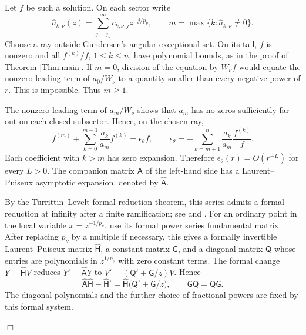 \documentclass[a4paper,12pt]{article}
\newenvironment{proof}
{\noindent{\it Proof.}}{\hfill $\Box$\par\vspace{2.5mm}}
\numberwithin{equation}{section}
\begin{document}
\begin{proof}
Let $f$ be such a solution. On each sector write
\[
 \widehat a_{k,\nu}(z)
 =\sum_{j=j_\nu}^{\infty}c_{k,\nu,j}z^{-j/p_\nu},
 \qquad
 m=\max\{k:\widehat a_{k,\nu}\ne0\}.
\]
Choose a ray outside Gundersen's angular exceptional set. On its tail,
$f$ is nonzero and all $f^{(k)}/f$, $1\le k\le n$, have polynomial bounds,
as in the proof of Theorem \ref{Thm.main}.
If $m=0$, division of the equation by $W_\nu f$ would equate the nonzero
leading term of $a_0/W_\nu$ to a quantity smaller than every negative
power of $r$. This is impossible. Thus $m\ge1$.

The nonzero leading term of $a_m/W_\nu$ shows that $a_m$ has no zeros
sufficiently far out on each closed subsector. Hence, on the chosen ray,
\begin{equation}\label{eq.puiseux.scalar}
 f^{(m)}+\sum_{k=0}^{m-1}\frac{a_k}{a_m}f^{(k)}
 =\epsilon_\theta f,
 \qquad
 \epsilon_\theta
 =-\sum_{k=m+1}^{n}\frac{a_k}{a_m}\frac{f^{(k)}}{f}.
\end{equation}
Each coefficient with $k>m$ has zero expansion. Therefore
$\epsilon_\theta(r)=O(r^{-L})$ for every $L>0$.
The companion matrix $\mathsf A$ of the left-hand side has a
Laurent--Puiseux asymptotic expansion, denoted by $\widehat{\mathsf A}$.

By the Turrittin--Levelt formal reduction theorem, this series admits a
formal reduction at infinity after a finite ramification; see
\cite{BabbittVaradarajan} and \cite[Theorem 4]{Barkatou}.
For an ordinary point in the local variable $x=z^{-1/p_\nu}$,
use its formal power series fundamental matrix.
After replacing $p_\nu$ by a multiple if necessary, this gives a formally
invertible Laurent--Puiseux matrix $\widehat{\mathsf H}$, a constant
matrix $\mathsf G$, and a diagonal matrix $\mathsf Q$ whose entries are
polynomials in $z^{1/p_\nu}$ with zero constant terms. The formal change $Y=\widehat{\mathsf H}V$ reduces
$Y'=\widehat{\mathsf A}Y$ to
$V'=(\mathsf Q'+\mathsf G/z)V$. Hence
\begin{equation}\label{eq.puiseux.formal}
 \widehat{\mathsf A}\widehat{\mathsf H}
 -\widehat{\mathsf H}'
 =\widehat{\mathsf H}\bigl(\mathsf Q'+\mathsf G/z\bigr),
 \qquad \mathsf G\mathsf Q=\mathsf Q\mathsf G.
\end{equation}
The diagonal polynomials and the further choice of fractional powers
are fixed by this formal system.


\end{proof}
\end{document}
